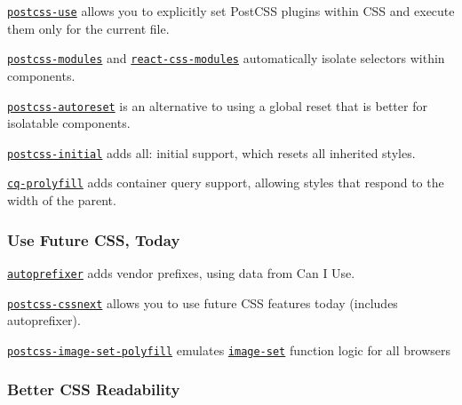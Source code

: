 \begin{DoxyItemize}
\item \href{https://github.com/postcss/postcss-use}{\tt {\ttfamily postcss-\/use}} allows you to explicitly set Post\+C\+SS plugins within C\+SS and execute them only for the current file.
\item \href{https://github.com/outpunk/postcss-modules}{\tt {\ttfamily postcss-\/modules}} and \href{https://github.com/gajus/react-css-modules}{\tt {\ttfamily react-\/css-\/modules}} automatically isolate selectors within components.
\item \href{https://github.com/maximkoretskiy/postcss-autoreset}{\tt {\ttfamily postcss-\/autoreset}} is an alternative to using a global reset that is better for isolatable components.
\item \href{https://github.com/maximkoretskiy/postcss-initial}{\tt {\ttfamily postcss-\/initial}} adds {\ttfamily all\+: initial} support, which resets all inherited styles.
\item \href{https://github.com/ausi/cq-prolyfill}{\tt {\ttfamily cq-\/prolyfill}} adds container query support, allowing styles that respond to the width of the parent.
\end{DoxyItemize}

\subsubsection*{Use Future C\+SS, Today}


\begin{DoxyItemize}
\item \href{https://github.com/postcss/autoprefixer}{\tt {\ttfamily autoprefixer}} adds vendor prefixes, using data from Can I Use.
\item \href{http://cssnext.io}{\tt {\ttfamily postcss-\/cssnext}} allows you to use future C\+SS features today (includes {\ttfamily autoprefixer}).
\item \href{https://github.com/SuperOl3g/postcss-image-set-polyfill}{\tt {\ttfamily postcss-\/image-\/set-\/polyfill}} emulates \href{https://drafts.csswg.org/css-images-3/#image-set-notation}{\tt {\ttfamily image-\/set}} function logic for all browsers
\end{DoxyItemize}

\subsubsection*{Better C\+SS Readability}


